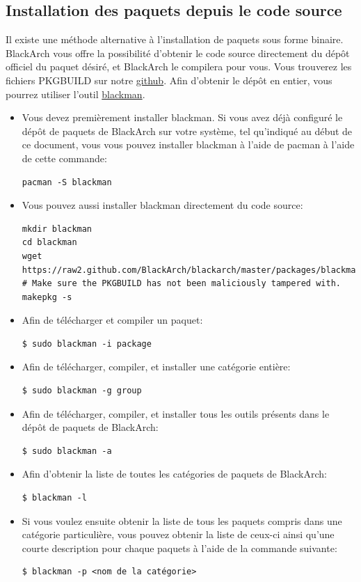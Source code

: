 \documentclass[a4paper, oneside, 11pt]{book}
\begin{document}
\subsection{Installation des paquets depuis le code source}
Il existe une méthode alternative à l'installation de paquets sous forme binaire.
BlackArch vous offre la possibilité d'obtenir le code source directement du
dépôt officiel du paquet désiré, et BlackArch le compilera pour vous. Vous
trouverez les fichiers PKGBUILD sur notre
\href{https://github.com/BlackArch/blackarch/tree/master/packages}{github}. Afin
d'obtenir le dépôt en entier, vous pourrez utiliser l'outil
\href{https://github.com/BlackArch/blackman}{blackman}.
\begin{itemize} \itemsep10pt
\item Vous devez premièrement installer blackman. Si vous avez déjà configuré
le dépôt de paquets de BlackArch sur votre système, tel qu'indiqué au début de
ce document, vous vous pouvez installer blackman à l'aide de pacman à l'aide de
cette commande:
{\small
\color{gray}
\begin{verbatim}
pacman -S blackman
\end{verbatim}
}
\item Vous pouvez aussi installer blackman directement du code source:
{\small
\color{gray}
\begin{verbatim}
mkdir blackman
cd blackman
wget https://raw2.github.com/BlackArch/blackarch/master/packages/blackman/PKGBUILD
# Make sure the PKGBUILD has not been maliciously tampered with.
makepkg -s
\end{verbatim}
}
\item Afin de télécharger et compiler un paquet:
{\small
\color{gray}
\begin{verbatim}
$ sudo blackman -i package
\end{verbatim}
}
\item Afin de télécharger, compiler, et installer une catégorie entière:
{\small
\color{gray}
\begin{verbatim}
$ sudo blackman -g group
\end{verbatim}
}
\item Afin de télécharger, compiler, et installer tous les outils présents
dans le dépôt de paquets de BlackArch:
{\small
\color{gray}
\begin{verbatim}
$ sudo blackman -a
\end{verbatim}
}
\item Afin d'obtenir la liste de toutes les catégories de paquets de BlackArch:
{\small
\color{gray}
\begin{verbatim}
$ blackman -l
\end{verbatim}
}
\item Si vous voulez ensuite obtenir la liste de tous les paquets compris dans
une catégorie particulière, vous pouvez obtenir la liste de ceux-ci ainsi qu'une
courte description pour chaque paquets à l'aide de la commande suivante:
{\small
\color{gray}
\begin{verbatim}
$ blackman -p <nom de la catégorie>
\end{verbatim}
}
\end{itemize}
\end{document}
